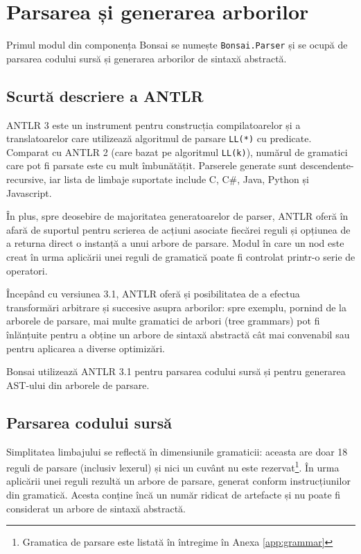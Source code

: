 \documentclass[12pt,a4paper]{memoir}
\renewcommand{\c}{\texttt}
\begin{document}
\chapter{Parsarea și generarea arborilor}

Primul modul din componența Bonsai se numește \c{Bonsai.Parser} și se ocupă de parsarea codului sursă și generarea arborilor de sintaxă abstractă.

\section{Scurtă descriere a ANTLR}

ANTLR 3\cite{antlr} este un instrument pentru construcția compilatoarelor și a translatoarelor care utilizează algoritmul de parsare \c{LL(*)} cu predicate\cite{definitive_antlr_reference}. Comparat cu ANTLR 2 (care bazat pe algoritmul \c{LL(k)}), numărul de gramatici care pot fi parsate este cu mult îmbunătățit. Parserele generate sunt descendente-recursive, iar lista de limbaje suportate\cite{antlr_targets} include C, C\#, Java, Python și Javascript. 

În plus, spre deosebire de majoritatea generatoarelor de parser, ANTLR oferă în afară de suportul pentru scrierea de acțiuni asociate fiecărei reguli și opțiunea de a returna direct o instanță a unui arbore de parsare. Modul în care un nod este creat în urma aplicării unei reguli de gramatică poate fi controlat printr-o serie de operatori\cite[cap. 7]{definitive_antlr_reference}.

Începând cu versiunea 3.1, ANTLR oferă și posibilitatea de a efectua transformări arbitrare și succesive asupra arborilor: spre exemplu, pornind de la arborele de parsare, mai multe gramatici de arbori (tree grammars) pot fi înlănțuite pentru a obține un arbore de sintaxă abstractă cât mai convenabil sau pentru aplicarea a diverse optimizări\cite{antlr_tree_grammars}\cite[cap. 8]{definitive_antlr_reference}.

Bonsai utilizează ANTLR 3.1 pentru parsarea codului sursă și pentru generarea AST-ului din arborele de parsare.

\section{Parsarea codului sursă}

Simplitatea limbajului se reflectă în dimensiunile gramaticii: aceasta are doar 18 reguli de parsare (inclusiv lexerul) și nici un cuvânt nu este rezervat\footnote{Gramatica de parsare este listată în întregime în Anexa \ref{app:grammar}}. În urma aplicării unei reguli rezultă un arbore de parsare, generat conform instrucțiunilor din gramatică. Acesta conține încă un număr ridicat de artefacte și nu poate fi considerat un arbore de sintaxă abstractă.
\end{document}
